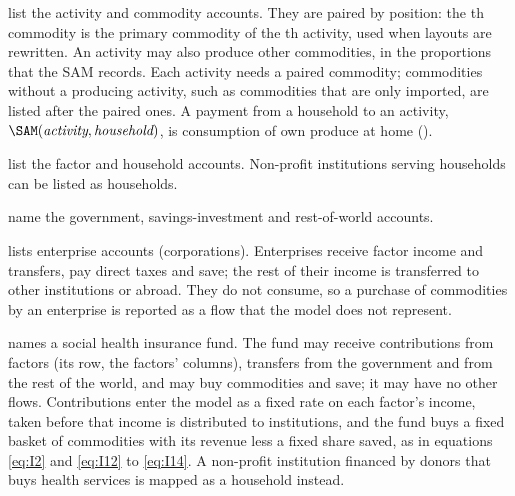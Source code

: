 \begin{optdesc}
\item[\optarg{}{activities}{namelist} and \optarg{}{commodities}{namelist}]
list the activity and commodity accounts. They are paired by position: the
th commodity is the primary commodity of the th activity, used
when layouts are rewritten. An activity may also produce other commodities,
in the proportions that the SAM records. Each activity needs a paired
commodity; commodities without a producing activity, such as commodities that
are only imported, are listed after the paired ones. A payment from a
household to an activity, $\SAM(\textit{activity}, \textit{household})$, is
consumption of own produce at home ().

\item[\optarg{}{factors}{namelist} and \optarg{}{households}{namelist}] list
the factor and household accounts. Non-profit institutions serving households
can be listed as households.

\item[\optarg{}{government}{name}, \optarg{}{savinv}{name} and
\optarg{}{row}{name}] name the government, savings-investment and
rest-of-world accounts.

\item[\optarg{}{enterprises}{namelist}] lists enterprise accounts
(corporations). Enterprises receive factor income and transfers, pay direct
taxes and save; the rest of their income is transferred to other institutions
or abroad. They do not consume, so a purchase of commodities by an enterprise
is reported as a flow that the model does not represent.

\item[\optarg{}{insurance}{name}] names a social health insurance fund. The
fund may receive contributions from factors (its row, the factors' columns),
transfers from the government and from the rest of the world, and may buy
commodities and save; it may have no other flows. Contributions enter the
model as a fixed rate on each factor's income, taken before that income is
distributed to institutions, and the fund buys a fixed basket of commodities
with its revenue less a fixed share saved, as in equations \eqref{eq:I2} and
\eqref{eq:I12} to \eqref{eq:I14}. A non-profit institution financed by donors that buys health
services is mapped as a household instead.


\end{optdesc}
